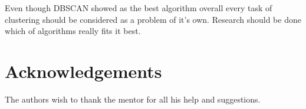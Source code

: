 \documentclass[conference]{IEEEtran}
\begin{document}
Even though DBSCAN showed as the best algorithm overall every task of clustering should be
considered as a problem of it's own. Research should be done which of algorithms
really fits it best.

\section*{Acknowledgements}
The authors wish to thank the mentor for all his help and suggestions.









\end{document}
